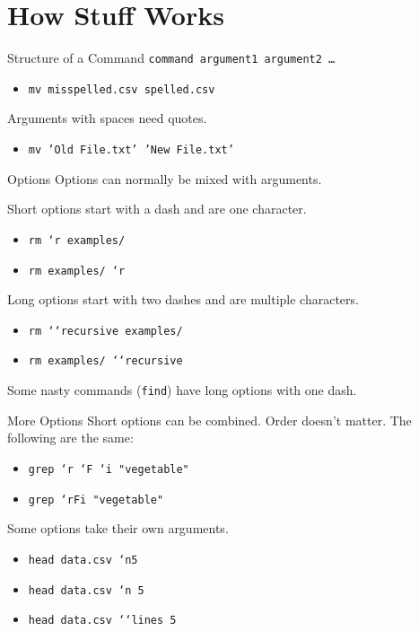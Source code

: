 \documentclass[pdf,usenames,dvipsnames,14pt]{beamer}%
\newcommand\hyphen{\char`\-}
\newcommand\doublehyphen{{\hyphen}{\hyphen}}
\begin{document}
\section{How Stuff Works}

\begin{frame}{Structure of a Command}
	\texttt{command argument1 argument2 \dots}
	\begin{itemize}
		\item \texttt{mv misspelled.csv spelled.csv}
	\end{itemize}
	
	Arguments with spaces need quotes.
	\begin{itemize}
		\item \texttt{mv 'Old File.txt' 'New File.txt'}
	\end{itemize}
\end{frame}

\begin{frame}{Options}
	Options can normally be mixed with arguments.
	
	Short options start with a dash and are one character.
	\begin{itemize}
		\item \texttt{rm \hyphen r examples/}
		\item \texttt{rm examples/ \hyphen r}
	\end{itemize}
	
	Long options start with two dashes and are multiple characters.
	\begin{itemize}
		\item \texttt{rm \doublehyphen recursive examples/}
		\item \texttt{rm examples/ \doublehyphen recursive}
	\end{itemize}
	
	Some nasty commands (\texttt{find}) have long options with one dash.
\end{frame}

\begin{frame}{More Options}
	Short options can be combined.
	Order doesn't matter.
	The following are the same:
	\begin{itemize}
		\item \texttt{grep \hyphen r \hyphen F \hyphen i "vegetable"}
		\item \texttt{grep \hyphen rFi "vegetable"}
	\end{itemize}
	Some options take their own arguments.
	\begin{itemize}
		\item \texttt{head data.csv \hyphen n5}
		\item \texttt{head data.csv \hyphen n 5}
		\item \texttt{head data.csv \doublehyphen lines 5}
	\end{itemize}
\end{frame}
\end{document}
